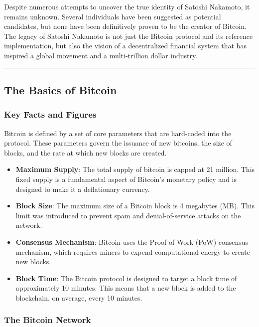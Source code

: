 Despite numerous attempts to uncover the true identity of Satoshi
Nakamoto, it remains unknown. Several individuals have been suggested as
potential candidates, but none have been definitively proven to be the
creator of Bitcoin. The legacy of Satoshi Nakamoto is not just the
Bitcoin protocol and its reference implementation, but also the vision
of a decentralized financial system that has inspired a global movement
and a multi-trillion dollar industry.

\begin{center}\rule{0.5\linewidth}{0.5pt}\end{center}

\subsection{The Basics of Bitcoin}\label{section-2-bitcoin-101-the-basics}

\subsubsection{Key Facts and Figures}\label{key-facts-and-figures}

Bitcoin is defined by a set of core parameters that are hard-coded into
the protocol. These parameters govern the issuance of new bitcoins, the
size of blocks, and the rate at which new blocks are created.

\begin{itemize}
	\tightlist
	\item
	\textbf{Maximum Supply}: The total supply of bitcoin is capped at 21
	million. This fixed supply is a fundamental aspect of Bitcoin's
	monetary policy and is designed to make it a deflationary currency.
	\item
	\textbf{Block Size}: The maximum size of a Bitcoin block is 4
	megabytes (MB). This limit was introduced to prevent spam and
	denial-of-service attacks on the network.
	\item
	\textbf{Consensus Mechanism}: Bitcoin uses the Proof-of-Work (PoW)
	consensus mechanism, which requires miners to expend computational
	energy to create new blocks.
	\item
	\textbf{Block Time}: The Bitcoin protocol is designed to target a
	block time of approximately 10 minutes. This means that a new block is
	added to the blockchain, on average, every 10 minutes.
\end{itemize}

\subsubsection{The Bitcoin Network}\label{the-bitcoin-network}

